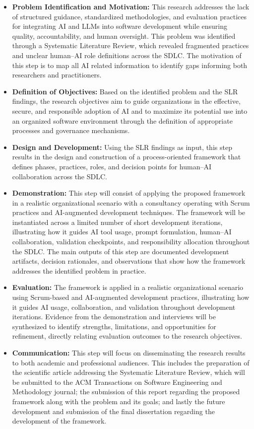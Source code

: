 \begin{itemize}
    \item \textbf{Problem Identification and Motivation:} This research addresses the lack of structured guidance, standardized methodologies, and evaluation practices for integrating AI and LLMs into software development while ensuring quality, accountability, and human oversight. This problem was identified through a Systematic Literature Review, which revealed fragmented practices and unclear human–AI role definitions across the SDLC. The motivation of this step is to map all AI related information to identify gaps informing both researchers and practitioners.
    \item \textbf{Definition of Objectives:} Based on the identified problem and the SLR findings, the research objectives aim to guide organizations in the effective, secure, and responsible adoption of AI and to maximize its potential use into an organized software environment through the definition of appropriate processes and governance mechanisms.
    \item \textbf{Design and Development:} Using the SLR findings as input, this step results in the design and construction of a process-oriented framework that defines phases, practices, roles, and decision points for human–AI collaboration across the SDLC.
    \item \textbf{Demonstration:} 
    This step will consist of applying the proposed framework in a realistic organizational scenario with a consultancy operating with Scrum practices and AI-augmented development techniques. The framework will be instantiated across a limited number of short development iterations, illustrating how it guides AI tool usage, prompt formulation, human–AI collaboration, validation checkpoints, and responsibility allocation throughout the SDLC. The main outputs of this step are documented development artifacts, decision rationales, and observations that show how the framework addresses the identified problem in practice.
    \item \textbf{Evaluation:} 
    The framework is applied in a realistic organizational scenario using Scrum-based and AI-augmented development practices, illustrating how it guides AI usage, collaboration, and validation throughout development iterations. Evidence from the demonstration and interviews will be synthesized to identify strengths, limitations, and opportunities for refinement, directly relating evaluation outcomes to the research objectives.
    \item \textbf{Communication:} This step will focus on disseminating the research results to both academic and professional audiences. This includes the preparation of the scientific article addressing the Systematic Literature Review, which will be submitted to the ACM Transactions on Software Engineering and Methodology journal; the submission of this report regarding the proposed framework along with the problem and its goals; and lastly the future development and submission of the final dissertation regarding the development of the framework.

\end{itemize}